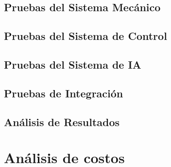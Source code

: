 \documentclass[a4paper,12pt]{report}
\begin{document}
%
%

\section{Pruebas del Sistema Mecánico}





\section{Pruebas del Sistema de Control}




\section{Pruebas del Sistema de IA}






\section{Pruebas de Integración}




\section{Análisis de Resultados}




\chapter{Análisis de costos}

\end{document}
